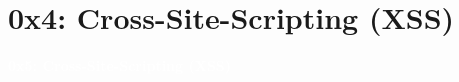 \documentclass[aspectratio=169]{beamer}
\begin{document}
\section{0x4: Cross-Site-Scripting (XSS)}
{
\begin{frame}
\huge{\textcolor{white}{\textbf{0x5: Cross-Site-Scripting (XSS)}}}
\end{frame}
}
\end{document}
